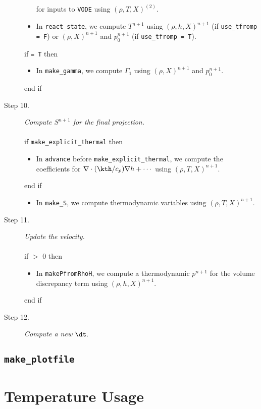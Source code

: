 \begin{description}
\begin{itemize}
for inputs to {\tt VODE} using $(\rho,T,X)^{(2)}$.
\item In {\tt react\_state}, we compute $T^{n+1}$ using $(\rho,h,X)^{n+1}$ 
(if {\tt use\_tfromp = F}) or $(\rho,X)^{n+1}$ and $p_0^{n+1}$ (if {\tt use\_tfromp = T}).
\end{itemize}
if  {\tt = T} then
\begin{itemize}
\item In {\tt make\_gamma}, we compute $\Gamma_1$ using $(\rho,X)^{n+1}$ and $p_0^{n+1}$.
\end{itemize}
end if
\item[Step 10.] {\em Compute $S^{n+1}$ for the final projection.}\\ \\
if {\tt make\_explicit\_thermal} then
\begin{itemize}
\item In {\tt advance} before {\tt make\_explicit\_thermal}, we compute the coefficients for 
$\nabla\cdot(\kth/c_p)\nabla h + \cdots$ using $(\rho,T,X)^{n+1}$.
\end{itemize}
end if
\begin{itemize}
\item In {\tt make\_S}, we compute thermodynamic variables using $(\rho,T,X)^{n+1}$.
\end{itemize}
\item[Step 11.] {\em Update the velocity.}\\ \\
if  $>$ 0 then
\begin{itemize}
\item In {\tt makePfromRhoH}, we compute a thermodynamic $p^{n+1}$ for the volume 
discrepancy term using $(\rho,h,X)^{n+1}$.
\end{itemize}
end if
\item[Step 12.] {\em Compute a new $\dt.$}
\end{description}

\subsection{{\tt make\_plotfile}}

\section{Temperature Usage}

